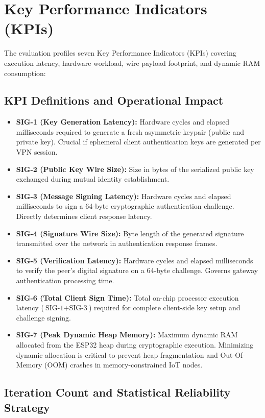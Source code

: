 \documentclass[11pt,a4paper]{article}
\begin{document}
\section{Key Performance Indicators (KPIs)}

The evaluation profiles seven Key Performance Indicators (KPIs) covering execution latency, hardware workload, wire payload footprint, and dynamic RAM consumption:

\subsection{KPI Definitions and Operational Impact}

\begin{itemize}
    \item \textbf{SIG-1 (Key Generation Latency):} Hardware cycles and elapsed milliseconds required to generate a fresh asymmetric keypair (public and private key). Crucial if ephemeral client authentication keys are generated per VPN session.
    \item \textbf{SIG-2 (Public Key Wire Size):} Size in bytes of the serialized public key exchanged during mutual identity establishment.
    \item \textbf{SIG-3 (Message Signing Latency):} Hardware cycles and elapsed milliseconds to sign a 64-byte cryptographic authentication challenge. Directly determines client response latency.
    \item \textbf{SIG-4 (Signature Wire Size):} Byte length of the generated signature transmitted over the network in authentication response frames.
    \item \textbf{SIG-5 (Verification Latency):} Hardware cycles and elapsed milliseconds to verify the peer's digital signature on a 64-byte challenge. Governs gateway authentication processing time.
    \item \textbf{SIG-6 (Total Client Sign Time):} Total on-chip processor execution latency ($\text{SIG-1} + \text{SIG-3}$) required for complete client-side key setup and challenge signing.
    \item \textbf{SIG-7 (Peak Dynamic Heap Memory):} Maximum dynamic RAM allocated from the ESP32 heap during cryptographic execution. Minimizing dynamic allocation is critical to prevent heap fragmentation and Out-Of-Memory (OOM) crashes in memory-constrained IoT nodes.
\end{itemize}

\subsection{Iteration Count and Statistical Reliability Strategy}
\end{document}
